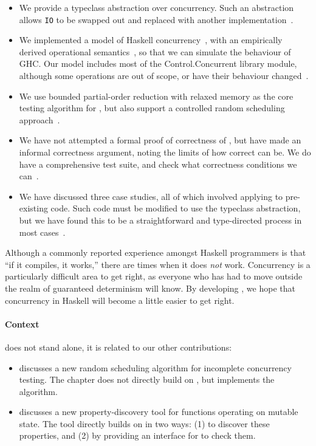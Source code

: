 \begin{itemize}
\item We provide a typeclass abstraction over concurrency.  Such an
  abstraction allows \verb|IO| to be swapped out and replaced with
  another implementation~.

\item We implemented a model of Haskell
  concurrency~, with an empirically derived
  operational semantics~, so that we can
  simulate the behaviour of GHC.  Our model includes most of the
  Control.Concurrent library module, although some operations are out
  of scope, or have their behaviour changed~.

\item We use bounded partial-order reduction \parencite{coons2013} with
  relaxed memory \parencite{zhang2015} as the core testing algorithm for
  \dejafu{}, but also support a controlled random scheduling
  approach~.

\item We have not attempted a formal proof of correctness of
  \dejafu{}, but have made an informal correctness argument, noting
  the limits of how correct \dejafu{} can be.  We do have a
  comprehensive test suite, and check what correctness conditions we
  can~.

\item We have discussed three case studies, all of which involved
  applying \dejafu{} to pre-existing code.  Such code must be modified
  to use the \dejafu{} typeclass abstraction, but we have found this
  to be a straightforward and type-directed process in most
  cases~.
\end{itemize}

Although a commonly reported experience amongst Haskell programmers is
that ``if it compiles, it works,'' there are times when it does
\emph{not} work.  Concurrency is a particularly difficult area to get
right, as everyone who has had to move outside the realm of guaranteed
determinism will know.  By developing \dejafu{}, we hope that
concurrency in Haskell will become a little easier to get right.

\paragraph{Context}
\dejafu{} does not stand alone, it is related to our other
contributions:

\begin{itemize}
\item {} discusses a new random scheduling
  algorithm for incomplete concurrency testing.  The chapter does not
  directly build on \dejafu{}, but \dejafu{} implements the algorithm.
\item {} discusses a new property-discovery tool for
  functions operating on mutable state.  The tool directly builds on
  \dejafu{} in two ways: (1) to discover these properties, and (2) by
  providing an interface for \dejafu{} to check them.
\end{itemize}
